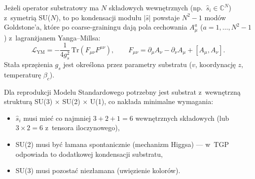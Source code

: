 \begin{remark}\label{rem:SUN-gauge}
Je\.zeli operator substratowy ma $N$ sk\l{}adowych
wewn\k{e}trznych (np.\ $\hat{s}_i \in \mathbb{C}^N$)
z~symetri\k{a} SU($N$), to po kondensacji modu\l{}u
$|\hat{s}|$ powstaje $N^2 - 1$ mod\'ow Goldstone'a,
kt\'ore po coarse-grainingu daj\k{a} pola cechowania
$A_\mu^a$ ($a = 1, \ldots, N^2-1$) z~lagran\.zjanem
Yanga--Millsa:
\begin{equation}\label{eq:L-YM-emergent}
  \mathcal{L}_{\mathrm{YM}} =
  -\frac{1}{4g_s^2}\,
  \mathrm{Tr}(F_{\mu\nu}F^{\mu\nu}),
  \qquad
  F_{\mu\nu} = \partial_\mu A_\nu - \partial_\nu A_\mu
  + [A_\mu, A_\nu].
\end{equation}
Sta\l{}a sprz\k{e}\.zenia $g_s$ jest okre\'slona
przez parametry substratu ($v$, koordynacj\k{e} $z$,
temperatur\k{e} $\beta_c$).

Dla reprodukcji Modelu Standardowego potrzebny jest
substrat z~wewn\k{e}trzn\k{a} struktur\k{a}
SU(3) $\times$ SU(2) $\times$ U(1), co nak\l{}ada
minimalne wymagania:
\begin{itemize}[nosep]
  \item $\hat{s}_i$ musi mie\'c co najmniej $3 + 2 + 1 = 6$
    wewn\k{e}trznych sk\l{}adowych (lub $3 \times 2 = 6$
    z~tensora iloczynowego),
  \item SU(2) musi by\'c \l{}amana spontanicznie
    (mechanizm Higgsa) --- w~TGP odpowiada to
    dodatkowej kondensacji substratu,
  \item SU(3) musi pozosta\'c niez\l{}amana
    (uwi\k{e}zienie kolor\'ow).
\end{itemize}
\end{remark}


